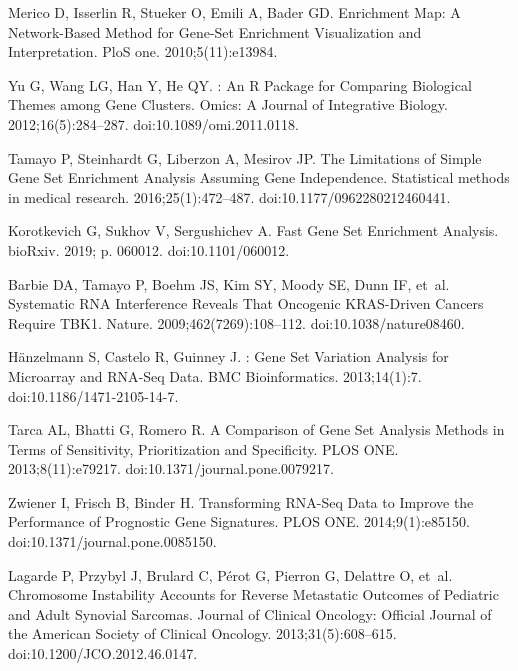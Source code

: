 \documentclass[10pt,letterpaper]{article}
\begin{document}
\begin{thebibliography}{10}
Merico D, Isserlin R, Stueker O, Emili A, Bader GD.
\newblock Enrichment Map: A Network-Based Method for Gene-Set Enrichment
Visualization and Interpretation.
\newblock PloS one. 2010;5(11):e13984.

Yu G, Wang LG, Han Y, He QY.
: An {{R}} Package for Comparing Biological Themes
among Gene Clusters.
\newblock Omics: A Journal of Integrative Biology. 2012;16(5):284--287.
\newblock doi:{10.1089/omi.2011.0118}.

Tamayo P, Steinhardt G, Liberzon A, Mesirov JP.
\newblock The {{Limitations}} of {{Simple Gene Set Enrichment Analysis Assuming
		Gene Independence}}.
\newblock Statistical methods in medical research. 2016;25(1):472--487.
\newblock doi:{10.1177/0962280212460441}.

Korotkevich G, Sukhov V, Sergushichev A.
\newblock Fast Gene Set Enrichment Analysis.
\newblock bioRxiv. 2019; p. 060012.
\newblock doi:{10.1101/060012}.

Barbie DA, Tamayo P, Boehm JS, Kim SY, Moody SE, Dunn IF, et~al.
\newblock Systematic {{RNA}} Interference Reveals That Oncogenic
{{KRAS}}-Driven Cancers Require {{TBK1}}.
\newblock Nature. 2009;462(7269):108--112.
\newblock doi:{10.1038/nature08460}.

H{\"a}nzelmann S, Castelo R, Guinney J.
: Gene Set Variation Analysis for Microarray and
{{RNA}}-{{Seq}} Data.
\newblock BMC Bioinformatics. 2013;14(1):7.
\newblock doi:{10.1186/1471-2105-14-7}.

Tarca AL, Bhatti G, Romero R.
\newblock A {{Comparison}} of {{Gene Set Analysis Methods}} in {{Terms}} of
{{Sensitivity}}, {{Prioritization}} and {{Specificity}}.
\newblock PLOS ONE. 2013;8(11):e79217.
\newblock doi:{10.1371/journal.pone.0079217}.

Zwiener I, Frisch B, Binder H.
\newblock Transforming {{RNA}}-{{Seq Data}} to {{Improve}} the {{Performance}}
of {{Prognostic Gene Signatures}}.
\newblock PLOS ONE. 2014;9(1):e85150.
\newblock doi:{10.1371/journal.pone.0085150}.

Lagarde P, Przybyl J, Brulard C, P{\'e}rot G, Pierron G, Delattre O, et~al.
\newblock Chromosome Instability Accounts for Reverse Metastatic Outcomes of
Pediatric and Adult Synovial Sarcomas.
\newblock Journal of Clinical Oncology: Official Journal of the American
Society of Clinical Oncology. 2013;31(5):608--615.
\newblock doi:{10.1200/JCO.2012.46.0147}.


\end{thebibliography}
\end{document}
